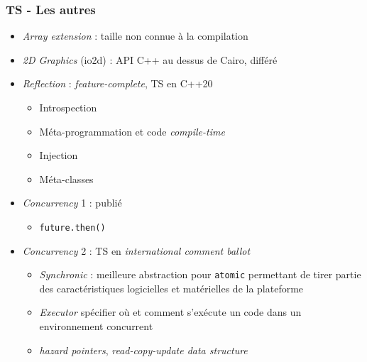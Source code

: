 \documentclass[C++.tex]{subfiles}
\begin{document}
\begin{frame}
	\frametitle{TS - Les autres}
	\begin{itemize}
		\item \textit{Array extension} : taille non connue à la compilation
		\item \textit{2D Graphics} (io2d) : API C++ au dessus de Cairo, différé


		\item \textit{Reflection} : \textit{feature-complete}, TS en \og C++20\fg{}
		\begin{itemize}
			\item Introspection
			\item Méta-programmation et code \textit{compile-time}
			\item Injection
			\item Méta-classes
		\end{itemize}


		\item \textit{Concurrency} 1 : publié
		\begin{itemize}
			\item \lstinline|future.then()|
		\end{itemize}
		\item \textit{Concurrency} 2 : TS en \textit{international comment ballot}
		\begin{itemize}
			\item \textit{Synchronic} : meilleure abstraction pour \lstinline|atomic| permettant de tirer partie des caractéristiques logicielles et matérielles de la plateforme
			\item \textit{Executor} spécifier où et comment s'exécute un code dans un environnement concurrent
			\item \textit{hazard pointers}, \textit{read-copy-update data structure}
		\end{itemize}
	\end{itemize}
\end{frame}
\end{document}
